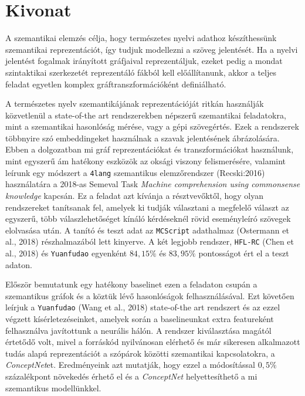 \chapter*{Kivonat}
A szemantikai elemzés célja, hogy természetes nyelvi adathoz
készíthessünk szemantikai reprezentációt, így tudjuk modellezni a szöveg jelentését. Ha a nyelvi
jelentést fogalmak irányított gráfjaival reprezentáljuk, ezeket pedig a mondat szintaktikai
szerkezetét reprezentáló fákból kell előállítanunk, akkor a teljes feladat egyetlen komplex gráftranszformációként
definiálható.

A természetes nyelv szemantikájának reprezentációját ritkán használják közvetlenül a state-of-the art rendszerekben népszerű szemantikai feladatokra, mint a szemantikai hasonlóság mérése, vagy a gépi szövegértés. Ezek a rendszerek többnyire szó embeddingeket használnak a szavak jelentésének ábrázolására.
Ebben a dolgozatban mi gráf reprezentációkat és transzformációkat használunk, mint egyszerű ám hatékony eszközök az oksági viszony felismerésére, valamint leírunk egy módszert a \texttt{4lang} szemantikus elemzőrendszer (Recski:2016) használatára a 2018-as Semeval Task \textit{Machine comprehension using commonsense knowledge} kapcsán. Ez a feladat azt kívánja a résztvevőktől, hogy olyan rendszereket tanítsanak fel, amelyek ki tudják választani a megfelelő választ az egyszerű, több válaszlehetőséget kínáló kérdéseknél rövid eseményleíró szövegek elolvasása után. A tanító és teszt adat az \texttt{MCScript} adathalmaz (Ostermann et al., 2018) részhalmazából lett kinyerve.
A két legjobb rendszer, \texttt{HFL-RC} (Chen et al., 2018) és \texttt{Yuanfudao} egyenként $84,15\%$ és $83,95\%$ pontosságot ért el a teszt adaton.

Először bemutatunk egy hatékony baselinet ezen a feladaton csupán a szemantikus gráfok és a köztük lévő hasonlóságok felhasználásával. Ezt követően leírjuk a \texttt{Yuanfudao} (Wang et al., 2018) state-of-the art rendszert és az ezzel végzett kísérletezéseinket, amelyek során
a baselineunkat extra featureként felhasználva javítottunk a neurális hálón. A rendszer kiválasztása magától értetődő volt, mivel a forráskód nyilvánosan elérhető és már sikeresen alkalmazott tudás alapú reprezentációt a szópárok közötti szemantikai kapcsolatokra, a \textit{ConceptNet}et.
Eredményeink azt mutatják, hogy ezzel a módosítással $0,5\%$ százalékpont növekedés érhető el és a \textit{ConceptNet} helyettesíthető a mi szemantikus modellünkkel.
\vfill


